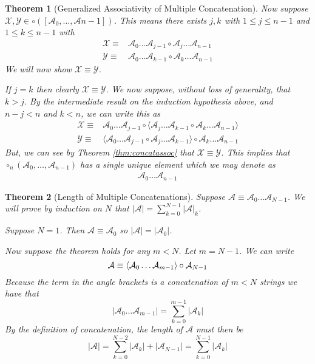 \documentclass[12pt]{article}
\theoremstyle{break}
\theoremstyle{break}
\newtheorem{theorem}{Theorem}[section]
\theoremstyle{break}
\theoremstyle{break}
\newcommand{\mc}[1]{\mathcal{#1}}
\begin{document}
\begin{theorem}[Generalized Associativity of Multiple Concatenation]
Now suppose $\mc{X}, \mc{Y} \in \circ([\mc{A}_0, \ldots, \mc{A}{n-1}])$.
This means there exists $j, k$ with $1 \le j \le n-1$ and $1 \le k \le n-1$ with
\begin{align}
\mc{X} \equiv& \mc{A}_0\ldots\mc{A}_{j-1} \circ \mc{A}_j \ldots \mc{A}_{n-1}\\
\mc{Y} \equiv& \mc{A}_0\ldots\mc{A}_{k-1} \circ \mc{A}_k \ldots \mc{A}_{n-1} 
\end{align}
We will now show $\mc{X} \equiv \mc{Y}$.

If $j=k$ then clearly $\mc{X}\equiv \mc{Y}$.
We now suppose, without loss of generality, that $k>j$.
By the intermediate result on the induction hypothesis above, and $n-j < n$ and $k<n$, we can write this as
\begin{align}
\mc{X} \equiv& \mc{A}_0\ldots\mc{A}_{j-1} \circ \langle\mc{A}_j\ldots\mc{A}_{k-1} \circ \mc{A}_k\ldots\mc{A}_{n-1}\rangle\\
\mc{Y} \equiv& \langle \mc{A}_0\ldots\mc{A}_{j-1}\circ\mc{A}_j\ldots\mc{A}_{k-1}\rangle\circ\mc{A}_k\ldots\mc{A}_{n-1}
\end{align}
But, we can see by Theorem \ref{thm:concatassoc} that $\mc{X}\equiv \mc{Y}$.
This implies that $\circ_n(\mc{A}_0,\ldots, \mc{A}_{n-1})$ has a single unique element which we may denote as
\begin{align*}
\mc{A}_0\ldots\mc{A}_{n-1}
\end{align*}

\end{theorem}

\begin{theorem}[Length of Multiple Concatenations]
\label{thm:multconcat}
Suppose $\mc{A} \equiv \mc{A}_0 \ldots \mc{A}_{N-1}$.
We will prove by induction on $N$ that $|\mc{A}| = \sum_{k=0}^{N-1} |\mc{A}|_k$.

Suppose $N=1$.
Then $\mc{A} \equiv \mc{A}_0$ so $|\mc{A}| = |\mc{A}_0|$.

Now suppose the theorem holds for any $m<N$. 
Let $m=N-1$.
We can write
$$
\mc{A} \equiv \Braket{\mc{A}_0 \ldots \mc{A}_{m-1}} \circ \mc{A}_{N-1}
$$
Because the term in the angle brackets is a concatenation of $m<N$ strings we have that 
$$
|\mc{A}_0\ldots \mc{A}_{m-1}| = \sum_{k=0}^{m-1} |\mc{A}_k|
$$
By the definition of concatenation, the length of $\mc{A}$ must then be
$$
|\mc{A}| = \sum_{k=0}^{N-2} |\mc{A}_k| + |\mc{A}_{N-1}| = \sum_{k=0}^{N-1}|\mc{A}_k|
$$
\end{theorem}
\end{document}
